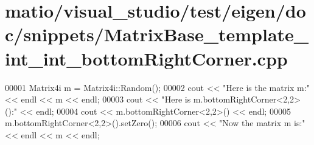 \hypertarget{matio_2visual__studio_2test_2eigen_2doc_2snippets_2_matrix_base__template__int__int__bottom_right_corner_8cpp_source}{}\section{matio/visual\+\_\+studio/test/eigen/doc/snippets/\+Matrix\+Base\+\_\+template\+\_\+int\+\_\+int\+\_\+bottom\+Right\+Corner.cpp}
\label{matio_2visual__studio_2test_2eigen_2doc_2snippets_2_matrix_base__template__int__int__bottom_right_corner_8cpp_source}

\begin{DoxyCode}
00001 Matrix4i m = Matrix4i::Random();
00002 cout << \textcolor{stringliteral}{"Here is the matrix m:"} << endl << m << endl;
00003 cout << \textcolor{stringliteral}{"Here is m.bottomRightCorner<2,2>():"} << endl;
00004 cout << m.bottomRightCorner<2,2>() << endl;
00005 m.bottomRightCorner<2,2>().setZero();
00006 cout << \textcolor{stringliteral}{"Now the matrix m is:"} << endl << m << endl;
\end{DoxyCode}
